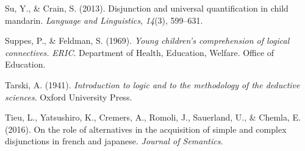 \documentclass[floatsintext,man]{apa6}
\theoremstyle{definition}
\theoremstyle{definition}
\theoremstyle{definition}
\theoremstyle{remark}
\begin{document}
\hypertarget{ref-su2013disjunction}{}
Su, Y., \& Crain, S. (2013). Disjunction and universal quantification in
child mandarin. \emph{Language and Linguistics}, \emph{14}(3), 599--631.

\hypertarget{ref-suppes1969young}{}
Suppes, P., \& Feldman, S. (1969). \emph{Young children's comprehension
of logical connectives.} \emph{ERIC}. Department of Health, Education,
Welfare. Office of Education.

\hypertarget{ref-tarski1941logic}{}
Tarski, A. (1941). \emph{Introduction to logic and to the methodology of
the deductive sciences}. Oxford University Press.

\hypertarget{ref-tieu2016}{}
Tieu, L., Yatsushiro, K., Cremers, A., Romoli, J., Sauerland, U., \&
Chemla, E. (2016). On the role of alternatives in the acquisition of
simple and complex disjunctions in french and japanese. \emph{Journal of
Semantics}.
\end{document}
